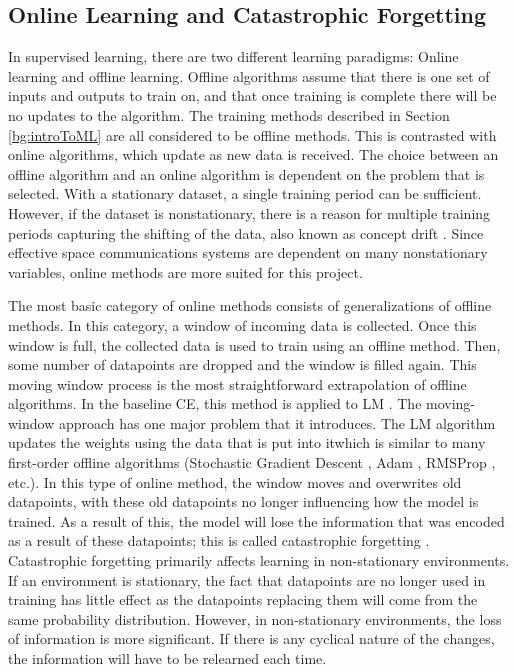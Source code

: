 	\subsection{Online Learning and Catastrophic Forgetting}\label{bg:onlineLearning}
	\par In supervised learning, there are two different learning paradigms: Online learning and offline learning. Offline algorithms assume that there is one set of inputs and outputs to train on, and that once training is complete there will be no updates to the algorithm. The training methods described in Section \ref{bg:introToML} are all considered to be offline methods. This is contrasted with online algorithms, which update as new data is received. The choice between an offline algorithm and an online algorithm is dependent on the problem that is selected. With a stationary dataset, a single training period can be sufficient. However, if the dataset is nonstationary, there is a reason for multiple training periods capturing the shifting of the data, also known as concept drift \cite{placeholderCitation}. Since effective space communications systems are dependent on many nonstationary variables, online methods are more suited for this project.
	\par The most basic category of online methods consists of generalizations of offline methods. In this category, a window of incoming data is collected. Once this window is full, the collected data is used to train using an offline method. Then, some number of datapoints are dropped and the window is filled again. This moving window process is the most straightforward extrapolation of offline algorithms. In the baseline CE, this method is applied to LM \cite{placeholderCitation}. The moving-window approach has one major problem that it introduces. The LM algorithm updates the weights using the data that is put into itwhich is similar to many first-order offline algorithms (Stochastic Gradient Descent \cite{placeholderCitation}, Adam \cite{placeholderCitation}, RMSProp \cite{placeholderCitation}, etc.). In this type of online method, the window moves and overwrites old datapoints, with these old datapoints no longer influencing how the model is trained. As a result of this, the model will lose the information that was encoded as a result of these datapoints; this is called catastrophic forgetting \cite{placeholderCitation}.  Catastrophic forgetting primarily affects learning in non-stationary environments. If an environment is stationary, the fact that datapoints are no longer used in training has little effect as the datapoints replacing them will come from the same probability distribution. However, in non-stationary environments, the loss of information is more significant. If there is any cyclical nature of the changes, the information will have to be relearned each time.

